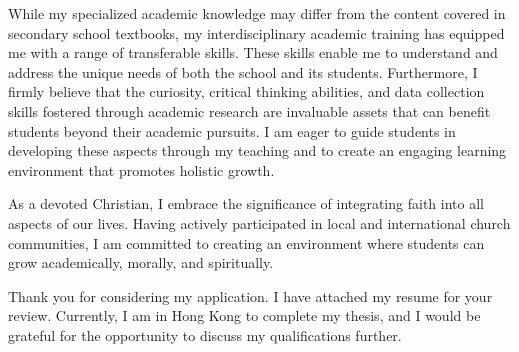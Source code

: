 \documentclass[11pt, a4paper]{awesome-cv}
\begin{document}
\begin{cvletter}
While my specialized academic knowledge may differ from the content covered in secondary school textbooks, my interdisciplinary academic training has equipped me with a range of transferable skills. These skills enable me to understand and address the unique needs of both the school and its students. Furthermore, I firmly believe that the curiosity, critical thinking abilities, and data collection skills fostered through academic research are invaluable assets that can benefit students beyond their academic pursuits. I am eager to guide students in developing these aspects through my teaching and to create an engaging learning environment that promotes holistic growth.

As a devoted Christian, I embrace the significance of integrating faith into all aspects of our lives. Having actively participated in local and international church communities, I am committed to creating an environment where students can grow academically, morally, and spiritually.

Thank you for considering my application. I have attached my resume for your review. Currently, I am in Hong Kong to complete my thesis, and I would be grateful for the opportunity to discuss my qualifications further.


\end{cvletter}


\makeletterclosing
\end{document}
